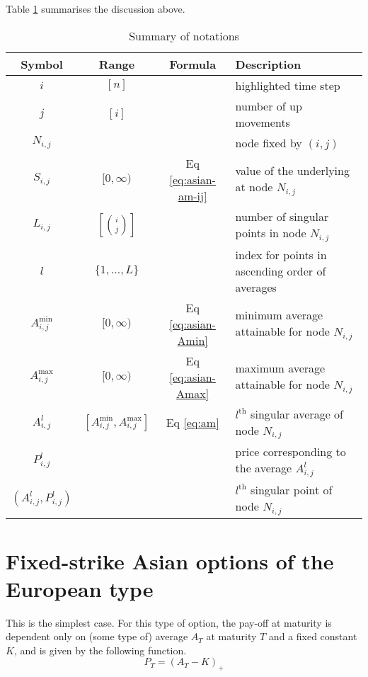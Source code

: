 Table \ref{tab:asian-notations} summarises the discussion above.

\begin{table}[h]
	\centering
	\caption{Summary of notations}
	\label{tab:asian-notations}
	\begin{tabular}{cccl}
		\toprule
		Symbol & Range & Formula & Description \\
		\midrule
		$ i $ & $ [ n ] $ & & highlighted time step \\
		$ j $ & $ [ i ] $ & & number of up movements \\
		$ N_{i,j} $ & & & node fixed by $ (i,j) $ \\
		$ S_{i,j} $ & $ [0, \infty) $ & Eq \ref{eq:asian-am-ij} & value of the underlying at node $ N_{i,j} $ \\
		$ L_{i,j} $ & $ \left[ \binom{i}{j} \right] $ & & number of singular points in node $ N_{i,j} $ \\
		$ l $ & $ \{ 1, \dots, L \} $ & & index for points in ascending order of averages \\
		$ A_{i,j}^{\min} $ & $ [0, \infty) $ & Eq \ref{eq:asian-Amin} & minimum average attainable for node $ N_{i,j} $ \\
		$ A_{i,j}^{\max} $ & $ [0, \infty) $ & Eq \ref{eq:asian-Amax} & maximum average attainable for node $ N_{i,j} $ \\
		$ A_{i,j}^l $ & $ \left[ A_{i,j}^{\min}, A_{i,j}^{\max} \right] $ & Eq \ref{eq:am} & $ l^\mathrm{th} $ singular average of node $ N_{i,j} $ \\
		$ P_{i,j}^l $ & & & price corresponding to the average $ A_{i,j}^l $ \\
		$ (A_{i,j}^l, P_{i,j}^l) $ & & & $ l^\mathrm{th} $ singular point of node $ N_{i,j} $ \\
		\bottomrule
	\end{tabular}
\end{table}



\section{Fixed-strike Asian options of the European type}
\label{sec:fixed-strike-eu}

This is the simplest case. For this type of option, the pay-off at maturity is dependent only on (some type of) average $ A_T $ at maturity $ T $ and a fixed constant $ K $, and is given by the following function.
\begin{equation}
	\label{eq:asian-price-eu-asian-am}
	P_T = (A_T - K)_+
\end{equation}

